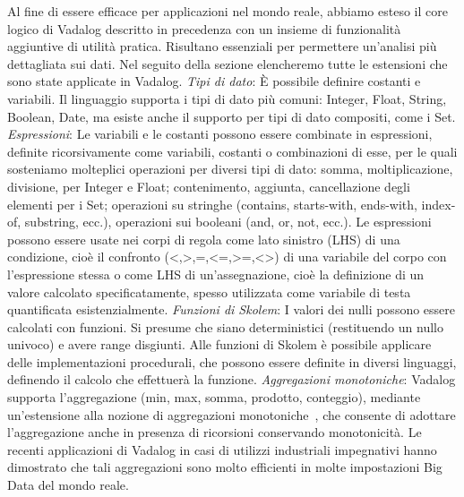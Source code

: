 Al fine di essere efficace per applicazioni nel mondo reale, abbiamo esteso il core logico di Vadalog descritto in precedenza con un insieme di funzionalità aggiuntive di utilità pratica. Risultano essenziali per permettere un'analisi più dettagliata sui dati. Nel seguito della sezione elencheremo tutte le estensioni che sono state applicate in Vadalog. \newline \newline
\emph{Tipi di dato}: È possibile definire costanti e variabili. Il linguaggio supporta i tipi di dato più comuni: Integer, Float, String, Boolean, Date, ma esiste anche il supporto per tipi di dato compositi, come i Set. \newline \newline
\emph{Espressioni}: Le variabili e le costanti possono essere combinate in espressioni, definite ricorsivamente come variabili, costanti o combinazioni di esse, per le quali sosteniamo molteplici operazioni per diversi tipi di dato: somma, moltiplicazione, divisione, per Integer e Float; contenimento, aggiunta, cancellazione degli elementi per i Set; operazioni su stringhe (contains, starts-with, ends-with, index-of, substring, ecc.), operazioni sui booleani (and, or, not, ecc.). \newline
Le espressioni possono essere usate nei corpi di regola come lato sinistro (LHS) di una condizione, cioè il confronto (<,>,=,<=,>=,<>) di una variabile del corpo con l'espressione stessa o come LHS di un'assegnazione, cioè la definizione di un valore calcolato specificatamente, spesso utilizzata come variabile di testa quantificata esistenzialmente. \newline \newline
\emph{Funzioni di Skolem}: I valori dei nulli possono essere calcolati con funzioni. Si presume che siano deterministici (restituendo un nullo univoco) e avere range disgiunti. Alle funzioni di Skolem è possibile applicare delle implementazioni procedurali, che possono essere definite in diversi linguaggi, definendo il calcolo che effettuerà la funzione. \newline \newline
\emph{Aggregazioni monotoniche}: Vadalog supporta l'aggregazione (min, max, somma, prodotto, conteggio), mediante un'estensione alla nozione di aggregazioni monotoniche~\cite{shkapsky2015optimizing}, che consente di adottare l'aggregazione anche in presenza di ricorsioni conservando monotonicità. Le recenti applicazioni di Vadalog in casi di utilizzi industriali impegnativi hanno dimostrato che tali aggregazioni sono molto efficienti in molte impostazioni Big Data del mondo reale. \newline \newline
